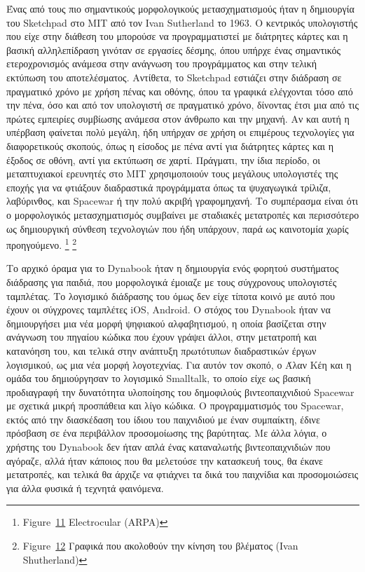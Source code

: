 \documentclass[
]{article}
\begin{document}
Ένας από τους πιο σημαντικούς μορφολογικούς μετασχηματισμούς ήταν η
δημιουργία του Sketchpad στο MIT από τον Ivan Sutherland το 1963. Ο
κεντρικός υπολογιστής που είχε στην διάθεση του μπορούσε να
προγραμματιστεί με διάτρητες κάρτες και η βασική αλληλεπίδραση γινόταν
σε εργασίες δέσμης, όπου υπήρχε ένας σημαντικός ετεροχρονισμός ανάμεσα
στην ανάγνωση του προγράμματος και στην τελική εκτύπωση του
αποτελέσματος. Αντίθετα, το Sketchpad εστιάζει στην διάδραση σε
πραγματικό χρόνο με χρήση πένας και οθόνης, όπου τα γραφικά ελέγχονται
τόσο από την πένα, όσο και από τον υπολογιστή σε πραγματικό χρόνο,
δίνοντας έτσι μια από τις πρώτες εμπειρίες συμβίωσης ανάμεσα στον
άνθρωπο και την μηχανή. Αν και αυτή η υπέρβαση φαίνεται πολύ μεγάλη, ήδη
υπήρχαν σε χρήση οι επιμέρους τεχνολογίες για διαφορετικούς σκοπούς,
όπως η είσοδος με πένα αντί για διάτρητες κάρτες και η έξοδος σε οθόνη,
αντί για εκτύπωση σε χαρτί. Πράγματι, την ίδια περίοδο, οι μεταπτυχιακοί
ερευνητές στο MIT χρησιμοποιούν τους μεγάλους υπολογιστές της εποχής για
να φτιάξουν διαδραστικά προγράμματα όπως τα ψυχαγωγικά τρίλιζα,
λαβύρινθος, και Spacewar ή την πολύ ακριβή γραφομηχανή. Το συμπέρασμα
είναι ότι ο μορφολογικός μετασχηματισμός συμβαίνει με σταδιακές
μετατροπές και περισσότερο ως δημιουργική σύνθεση τεχνολογιών που ήδη
υπάρχουν, παρά ως καινοτομία χωρίς προηγούμενο. \footnote{Figure~\protect\hyperlink{fig:electrocular}{11}
  Electrocular (ARPA)} \footnote{Figure~\protect\hyperlink{fig:damocles-sword}{12}
  Γραφικά που ακολοθούν την κίνηση του βλέματος (Ivan Shutherland)}

Το αρχικό όραμα για το Dynabook ήταν η δημιουργία ενός φορητού
συστήματος διάδρασης για παιδιά, που μορφολογικά έμοιαζε με τους
σύγχρονους υπολογιστές ταμπλέτας. Το λογισμικό διάδρασης του όμως δεν
είχε τίποτα κοινό με αυτό που έχουν οι σύγχρονες ταμπλέτες iOS, Android.
Ο στόχος του Dynabook ήταν να δημιουργήσει μια νέα μορφή ψηφιακού
αλφαβητισμού, η οποία βασίζεται στην ανάγνωση του πηγαίου κώδικα που
έχουν γράψει άλλοι, στην μετατροπή και κατανόηση του, και τελικά στην
ανάπτυξη πρωτότυπων διαδραστικών έργων λογισμικού, ως μια νέα μορφή
λογοτεχνίας. Για αυτόν τον σκοπό, ο Άλαν Κέη και η ομάδα του
δημιούργησαν το λογισμικό Smalltalk, το οποίο είχε ως βασική προδιαγραφή
την δυνατότητα υλοποίησης του δημοφιλούς βιντεοπαιχνιδιού Spacewar με
σχετικά μικρή προσπάθεια και λίγο κώδικα. Ο προγραμματισμός του
Spacewar, εκτός από την διασκέδαση του ίδιου του παιχνιδιού με έναν
συμπαίκτη, έδινε πρόσβαση σε ένα περιβάλλον προσομοίωσης της βαρύτητας.
Με άλλα λόγια, ο χρήστης του Dynabook δεν ήταν απλά ένας καταναλωτής
βιντεοπαιχνιδιών που αγόραζε, αλλά ήταν κάποιος που θα μελετούσε την
κατασκευή τους, θα έκανε μετατροπές, και τελικά θα άρχιζε να φτιάχνει τα
δικά του παιχνίδια και προσομοιώσεις για άλλα φυσικά ή τεχνητά
φαινόμενα.
\end{document}
